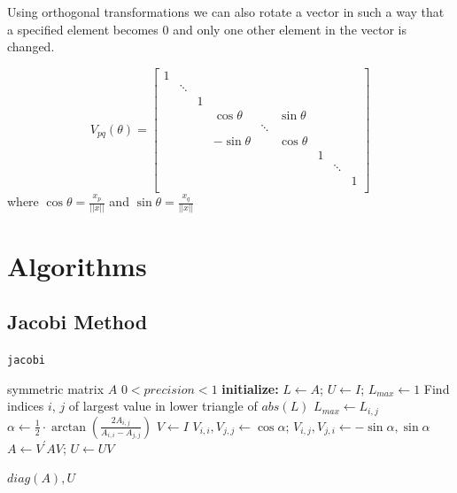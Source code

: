 \documentclass[12pt]{article}
\begin{document}
Using orthogonal transformations we can also rotate a vector in such a way that a specified element becomes 0 and only one other element in the vector is changed.

\begin{equation}
\label{givens-rotation}
V_{pq}(\theta) = \begin{bmatrix}
                      1 &  &  &  &  &  &  &  &  \\
                       & \ddots &  &  &  &  & &  &  \\
                       &  & 1 &  &  &  &  &  &  \\
                       &  &  & \cos\theta &  & \sin\theta &  &  &  \\
                       &  &  &  & \ddots &  &  &  &  \\
                       &  &  & -\sin\theta &  & \cos\theta &  &  &  \\
                       &  &  &  &  &  & 1 &  &  \\
                       &  &  &  &  &  &  & \ddots &  \\
                       &  &  &  &  &  &  &  & 1 \\                      
                 \end{bmatrix}
\end{equation}
	where $\cos\theta = \frac{x_p}{||x||}$ and $\sin\theta = \frac{x_q}{||x||}$



\section{Algorithms}
\subsection{Jacobi Method}


\begin{algorithm}[H]
\caption{\texttt{jacobi}}
\label{j-algo}
\begin{algorithmic}
  \Require symmetric matrix $A$
  \Ensure $0 < precision < 1$
  \Statex \textbf{initialize: } $L \gets A$; $U \gets I$; $L_{max} \gets 1$
    \State Find indices $i$, $j$ of largest value in lower triangle of $abs(L)$
        \State $L_{max} \gets L_{i,j}$
            \State $\alpha \gets \frac{1}{2}\cdot \arctan(\frac{2A_{i, j}}{A_{i, i}-A_{j, j}})$
    \State $V \gets I$
    \State $V_{i, i}, V_{j, j} \gets \cos \alpha$; $V_{i, j}, V_{j, i} \gets -\sin \alpha, \sin \alpha$
    \State $A \gets V^{\prime} A V$; $U \gets UV$

  \EndWhile
  \Return $diag(A), U$
\end{algorithmic}
\end{algorithm}
\end{document}
